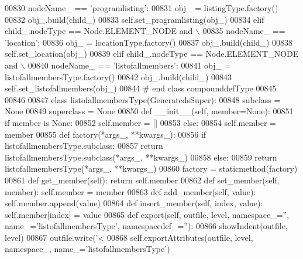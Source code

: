 \begin{DoxyCode}
{{{{{{{{{{{{{{{{{{{{{{{{{{{{{{{{{{{00830             nodeName\_ == \textcolor{stringliteral}{'programlisting'}:
00831             obj\_ = listingType.factory()
00832             obj\_.build(child\_)
00833             self.set_programlisting(obj\_)
00834         \textcolor{keywordflow}{elif} child\_.nodeType == Node.ELEMENT\_NODE \textcolor{keywordflow}{and} \(\backslash\)
00835             nodeName\_ == \textcolor{stringliteral}{'location'}:
00836             obj\_ = locationType.factory()
00837             obj\_.build(child\_)
00838             self.set_location(obj\_)
00839         \textcolor{keywordflow}{elif} child\_.nodeType == Node.ELEMENT\_NODE \textcolor{keywordflow}{and} \(\backslash\)
00840             nodeName\_ == \textcolor{stringliteral}{'listofallmembers'}:
00841             obj\_ = listofallmembersType.factory()
00842             obj\_.build(child\_)
00843             self.set_listofallmembers(obj\_)
00844 \textcolor{comment}{# end class compounddefType}
00845 
00846 
00847 \textcolor{keyword}{class }listofallmembersType(GeneratedsSuper):
00848     subclass = \textcolor{keywordtype}{None}
00849     superclass = \textcolor{keywordtype}{None}
00850     \textcolor{keyword}{def }__init__(self, member=None):
00851         \textcolor{keywordflow}{if} member \textcolor{keywordflow}{is} \textcolor{keywordtype}{None}:
00852             self.member = []
00853         \textcolor{keywordflow}{else}:
00854             self.member = member
00855     \textcolor{keyword}{def }factory(*args\_, **kwargs\_):
00856         \textcolor{keywordflow}{if} listofallmembersType.subclass:
00857             \textcolor{keywordflow}{return} listofallmembersType.subclass(*args\_, **kwargs\_)
00858         \textcolor{keywordflow}{else}:
00859             \textcolor{keywordflow}{return} listofallmembersType(*args\_, **kwargs\_)
00860     factory = staticmethod(factory)
00861     \textcolor{keyword}{def }get_member(self): \textcolor{keywordflow}{return} self.member
00862     \textcolor{keyword}{def }set_member(self, member): self.member = member
00863     \textcolor{keyword}{def }add_member(self, value): self.member.append(value)
00864     \textcolor{keyword}{def }insert_member(self, index, value): self.member[index] = value
00865     \textcolor{keyword}{def }export(self, outfile, level, namespace\_='', name\_='listofallmembersType', namespacedef\_=''):
00866         showIndent(outfile, level)
00867         outfile.write(\textcolor{stringliteral}{'<%
00868         self.exportAttributes(outfile, level, namespace\_, name\_=\textcolor{stringliteral}{'listofallmembersType'})
}}}}}}}}}}}}}}}}}}}}}}}}}}}}}}}}}}}}
\end{DoxyCode}
